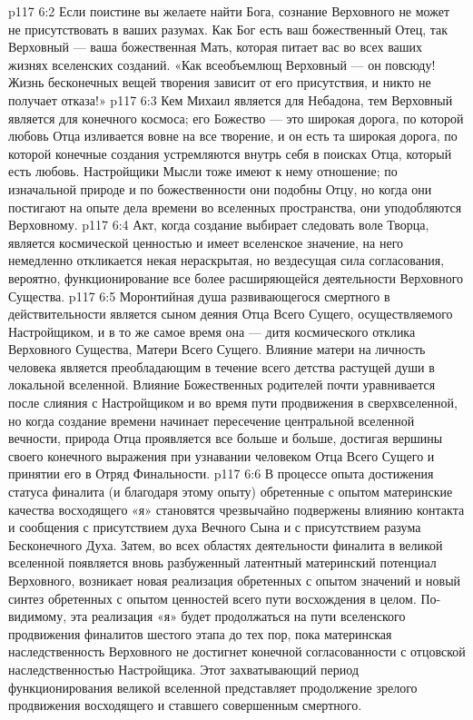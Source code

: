 \vs p117 6:2 Если поистине вы желаете найти Бога, сознание Верховного не может не присутствовать в ваших разумах. Как Бог есть ваш божественный Отец, так Верховный --- ваша божественная Мать, которая питает вас во всех ваших жизнях вселенских созданий. «Как всеобъемлющ Верховный --- он повсюду! Жизнь бесконечных вещей творения зависит от его присутствия, и никто не получает отказа!»
\vs p117 6:3 Кем Михаил является для Небадона, тем Верховный является для конечного космоса; его Божество --- это широкая дорога, по которой любовь Отца изливается вовне на все творение, и он есть та широкая дорога, по которой конечные создания устремляются внутрь себя в поисках Отца, который есть любовь. Настройщики Мысли тоже имеют к нему отношение; по изначальной природе и по божественности они подобны Отцу, но когда они постигают на опыте дела времени во вселенных пространства, они уподобляются Верховному.
\vs p117 6:4 \pc Акт, когда создание выбирает следовать воле Творца, является космической ценностью и имеет вселенское значение, на него немедленно откликается некая нераскрытая, но вездесущая сила согласования, вероятно, функционирование все более расширяющейся деятельности Верховного Существа.
\vs p117 6:5 Моронтийная душа развивающегося смертного в действительности является сыном деяния Отца Всего Сущего, осуществляемого Настройщиком, и в то же самое время она --- дитя космического отклика Верховного Существа, Матери Всего Сущего. Влияние матери на личность человека является преобладающим в течение всего детства растущей души в локальной вселенной. Влияние Божественных родителей почти уравнивается после слияния с Настройщиком и во время пути продвижения в сверхвселенной, но когда создание времени начинает пересечение центральной вселенной вечности, природа Отца проявляется все больше и больше, достигая вершины своего конечного выражения при узнавании человеком Отца Всего Сущего и принятии его в Отряд Финальности.
\vs p117 6:6 В процессе опыта достижения статуса финалита (и благодаря этому опыту) обретенные с опытом материнские качества восходящего «я» становятся чрезвычайно подвержены влиянию контакта и сообщения с присутствием духа Вечного Сына и с присутствием разума Бесконечного Духа. Затем, во всех областях деятельности финалита в великой вселенной появляется вновь разбуженный латентный материнский потенциал Верховного, возникает новая реализация обретенных с опытом значений и новый синтез обретенных с опытом ценностей всего пути восхождения в целом. По\hyp{}видимому, эта реализация «я» будет продолжаться на пути вселенского продвижения финалитов шестого этапа до тех пор, пока материнская наследственность Верховного не достигнет конечной согласованности с отцовской наследственностью Настройщика. Этот захватывающий период функционирования великой вселенной представляет продолжение зрелого продвижения восходящего и ставшего совершенным смертного.
